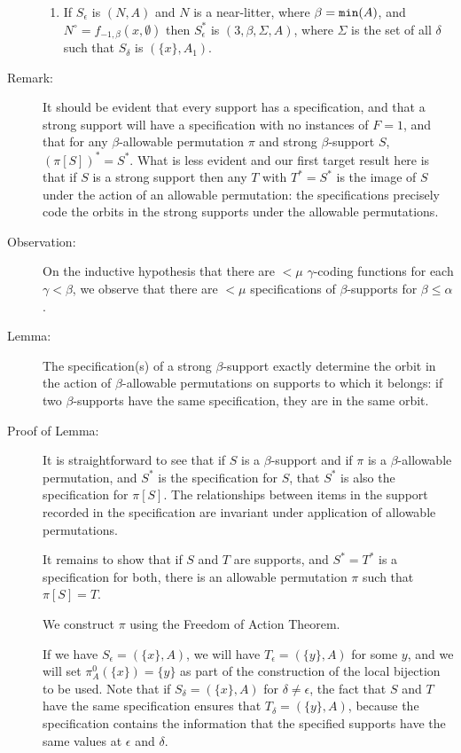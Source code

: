 \documentclass[112pt]{article}
\begin{document}
\begin{description}
\begin{enumerate}
\item  If $S_\epsilon$ is $(N,A)$ and $N$ is a near-litter, where $\beta={\tt min}(A)$, and $N^\circ=f_{-1,\beta}(x,\emptyset)$  then $S^*_\epsilon$ is $(3,\beta,\Sigma,A)$, where  $\Sigma$ is the set of all $\delta$ such that $S_\delta$ is $(\{x\},A_1)$.

\end{enumerate}



\item[Remark:]  It should be evident that every support has a specification, and that a strong support will have a specification with no instances of $F = 1$, and that for any $\beta$-allowable permutation $\pi$ and strong $\beta$-support $S$,
$(\pi[S])^* = S^*$.  What is less evident and our first target result here is that if $S$ is a strong support then any $T$ with $T^* = S^*$ is the image of $S$ under the action of an allowable permutation:  the specifications precisely code the orbits in the strong supports under the allowable permutations.

\item[Observation:]  On the inductive hypothesis that there are $<\mu$ $\gamma$-coding functions for each $\gamma<\beta$, we observe that there are $<\mu$ specifications of $\beta$-supports for $\beta\leq \alpha$.

\item[Lemma:]  The specification(s) of a strong $\beta$-support exactly determine the orbit in the action of $\beta$-allowable permutations on supports to which it belongs:  if two $\beta$-supports have the same specification, they are in the same orbit.

\item[Proof of Lemma:]

It is straightforward to see that if $S$ is a $\beta$-support and if $\pi$ is a $\beta$-allowable permutation, and $S^*$ is the  specification for $S$, that $S^*$ is also the specification for $\pi[S]$.  The relationships between items in the support recorded in the specification are invariant under application of allowable permutations.

It remains to show that if $S$ and $T$ are supports, and $S^*=T^*$ is a specification for both, there is an allowable permutation $\pi$ such that $\pi[S]=T$.  

We construct $\pi$ using the Freedom of Action Theorem.

If we have $S_\epsilon = (\{x\},A)$, we will have $T_\epsilon = (\{y\},A)$ for some $y$, and we will set $\pi^0_A(\{x\}) = \{y\}$ as part of the construction of the local bijection to be used.     Note that if $S_\delta = (\{x\},A)$ for $\delta \neq \epsilon$, the fact that $S$ and
$T$ have the same specification ensures that $T_\delta = (\{y\},A)$, because the specification contains the information that the specified supports have the same values at $\epsilon$ and $\delta$.


\end{description}
\end{document}
